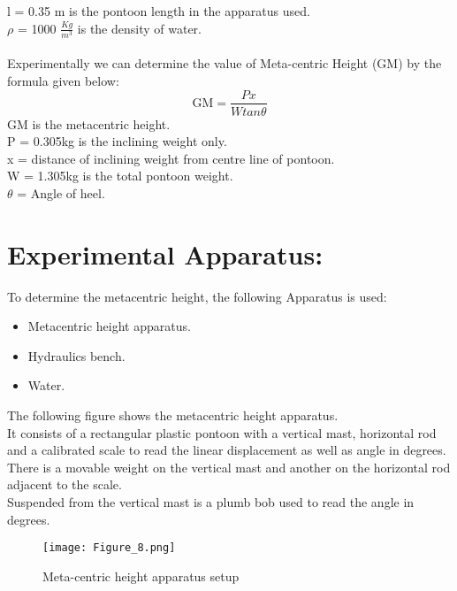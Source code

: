 \documentclass[12pt,a4paper]{article}
\begin{document}
l = 0.35 m is the pontoon length in the apparatus used.\\
$\rho$ = 1000 $\frac{\text{$Kg$}}{\text{$m^3$}}$ is the density of water.\\
\\Experimentally we can determine the value of Meta-centric Height (GM) by the formula given below:
\begin{equation}
    \text{GM} = \text{$\frac{\text{$Px$}}{\text{$W tan\theta$}}$}
\end{equation}
GM is the metacentric height.\\
P = 0.305kg is the inclining weight only.\\
x = distance of inclining weight from centre line of pontoon.\\
W = 1.305kg is the total pontoon weight.\\
$\theta$ = Angle of heel.
\section{Experimental Apparatus:}
To determine the metacentric height, the following Apparatus is used:
\begin{itemize}
\item Metacentric height apparatus.
\item Hydraulics bench.
\item Water.
\end{itemize}
The following figure shows the metacentric height apparatus.\\
It consists of a rectangular plastic pontoon with a vertical mast, horizontal rod and a calibrated scale to read the linear displacement as well as angle in degrees.\\
There is a movable weight on the vertical mast and another on the horizontal rod adjacent to the scale.\\
Suspended from the vertical mast is a plumb bob used to read the angle in degrees.
\begin{figure}[!ht]
	\begin{center}
			\texttt{[image: Figure\_8.png]}
	\end{center}
	\caption{Meta-centric height apparatus setup}
\end{figure}
\end{document}
